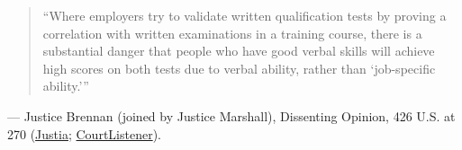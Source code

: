 \documentclass[12pt]{article}
\begin{document}
\begin{quote}
``Where employers try to validate written qualification tests by proving a correlation with written examinations in a training course, there is a substantial danger that people who have good verbal skills will achieve high scores on both tests due to verbal ability, rather than `job-specific ability.'''
\end{quote}
\noindent --- Justice Brennan (joined by Justice Marshall), Dissenting Opinion, 426 U.S. at 270 (\href{https://supreme.justia.com/cases/federal/us/426/229/}{Justia}; \href{https://www.courtlistener.com/opinion/109469/washington-v-davis/}{CourtListener}).
\end{document}
